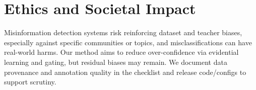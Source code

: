 \section{Ethics and Societal Impact}
Misinformation detection systems risk reinforcing dataset and teacher biases, especially against specific communities or topics, and misclassifications can have real-world harms. Our method aims to reduce over-confidence via evidential learning and gating, but residual biases may remain. We document data provenance and annotation quality in the checklist and release code/configs to support scrutiny.
